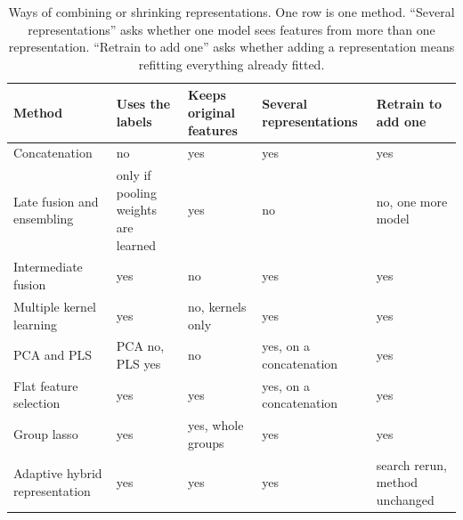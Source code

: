 \begin{table}[htbp]
\centering
\small
\setlength{\tabcolsep}{3pt}
\caption{Ways of combining or shrinking representations. One row is one method. ``Several representations'' asks whether one model sees features from more than one representation. ``Retrain to add one'' asks whether adding a representation means refitting everything already fitted.}
\label{tab:hybrid_alternatives}
\begin{tabular}{p{4.2cm}p{2.3cm}p{2.1cm}p{2.3cm}p{2.6cm}}
\toprule
Method & Uses the labels & Keeps original features & Several representations & Retrain to add one \\
\midrule
Concatenation \citep{Stahlschmidt2022} & no & yes & yes & yes \\
Late fusion and ensembling \citep{Steyaert2023, Valsecchi2020} & only if pooling weights are learned & yes & no & no, one more model \\
Intermediate fusion \citep{Wang2021} & yes & no & yes & yes \\
Multiple kernel learning \citep{Gonen2011, Cichonska2018} & yes & no, kernels only & yes & yes \\
PCA and PLS \citep{Jolliffe2016, Wold2001} & PCA no, PLS yes & no & yes, on a concatenation & yes \\
Flat feature selection \citep{Guyon2003} & yes & yes & yes, on a concatenation & yes \\
Group lasso \citep{Yuan2006} & yes & yes, whole groups & yes & yes \\
Adaptive hybrid representation & yes & yes & yes & search rerun, method unchanged \\
\bottomrule
\end{tabular}
\end{table}
